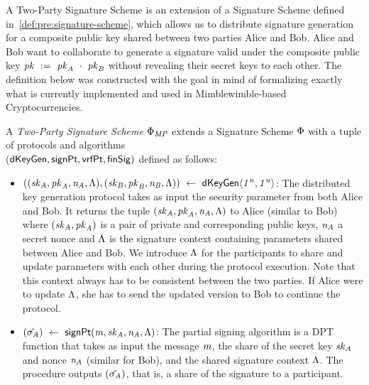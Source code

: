 A Two-Party Signature Scheme is an extension of a Signature Scheme defined in~\cref{def:pre:signature-scheme}, which allows us to distribute signature generation for a composite public key shared between two parties Alice and Bob.
Alice and Bob want to collaborate to generate a signature valid under the composite public key $\mathit{pk} ~:=~ \mathit{pk}_{\mathit{A}} ~\cdot~ \mathit{pk}_{\mathit{B}}$ without revealing their secret keys to each other.
The definition below was constructed with the goal in mind of formalizing exactly what is currently implemented and used in Mimblewimble-based Cryptocurrencies.

\begin{definition}
    \label{def:sig:two-party-sig}

    A \emph{Two-Party Signature Scheme $\Phi_{\mathit{MP}}$} extends a Signature Scheme $\Phi$ with a tuple of protocols and algorithms\\
    ($\mathsf{dKeyGen}, \mathsf{signPt} , \mathsf{vrfPt}, \mathsf{finSig})$ defined as follows:

    \begin{itemize}
        \item $((\mathit{sk}_{\mathit{A}}, \mathit{pk}_{\mathit{A}}, \mathit{\mathit{n}_{\mathit{A}}}, \Lambda), (\mathit{sk}_{\mathit{B}}, \mathit{pk}_{\mathit{B}}, \mathit{\mathit{n}_{\mathit{B}}}, \Lambda)) ~\leftarrow~ \mathsf{dKeyGen}\langle \mathit{1^n}, \mathit{1^n} \rangle$: The distributed key generation protocol takes as input the security parameter from both Alice and Bob.
        It returns the tuple $(\mathit{sk}_{\mathit{A}}, \mathit{pk}_{\mathit{A}}, \mathit{\mathit{n}_{\mathit{A}}}, \Lambda)$ to Alice (similar to Bob) where $(\mathit{sk}_{\mathit{A}}, \mathit{pk}_{\mathit{A}})$ is a pair of private and corresponding public keys, $\mathit{\mathit{n}_{\mathit{A}}}$ a secret nonce and $\Lambda$ is the signature context containing parameters shared between Alice and Bob.
        We introduce $\Lambda$ for the participants to share and update parameters with each other during the protocol execution.
        Note that this context always has to be consistent between the two parties.
        If Alice were to update $\Lambda$, she has to send the updated version to Bob to continue the protocol.

        \item $(\tilde{\sigma_{\mathit{A}}}) ~\leftarrow~ \mathsf{signPt}(\mathit{m}, \mathit{sk}_{\mathit{A}}, \mathit{\mathit{n}_{\mathit{A}}}, \Lambda)$: The partial signing algorithm is a DPT function that takes as input the message $\mathit{m}$, the share of the secret key $\mathit{sk}_{\mathit{A}}$ and nonce $\mathit{\mathit{n}_{\mathit{A}}}$ (similar for Bob), and the shared signature context $\Lambda$. The procedure outputs $(\tilde{\sigma_{\mathit{A}}})$, that is, a share of the signature to a participant.


\end{itemize}
\end{definition}
